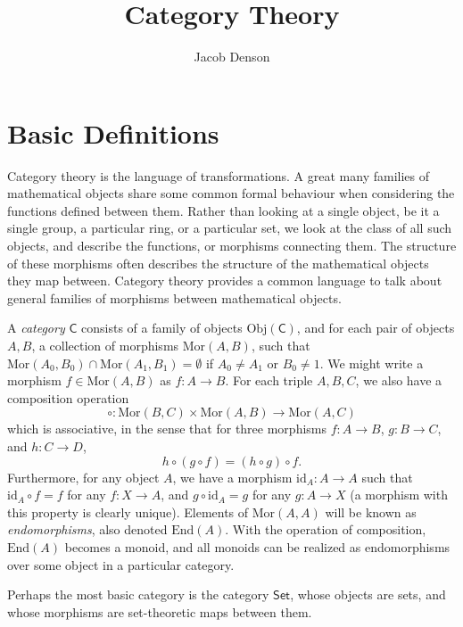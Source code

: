 

\title{Category Theory}
\author{Jacob Denson}



\maketitle
\tableofcontents

\chapter{Basic Definitions}


Category theory is the language of transformations. A great many families of mathematical objects share some common formal behaviour when considering the functions defined between them. Rather than looking at a single object, be it a single group, a particular ring, or a particular set, we look at the class of all such objects, and describe the functions, or morphisms connecting them. The structure of these morphisms often describes the structure of the mathematical objects they map between. Category theory provides a common language to talk about general families of morphisms between mathematical objects.

A \emph{category} $\mathsf{C}$ consists of a family of objects $\text{Obj}(\mathsf{C})$, and for each pair of objects $A,B$, a collection of morphisms $\text{Mor}(A,B)$, such that $\text{Mor}(A_0,B_0) \cap \text{Mor}(A_1,B_1) = \emptyset$ if $A_0 \neq A_1$ or $B_0 \neq 1$. We might write a morphism $f \in \text{Mor}(A,B)$ as $f: A \to B$. For each triple $A,B,C$, we also have a composition operation
%
\[ \circ: \text{Mor}(B,C) \times \text{Mor}(A,B) \to \text{Mor}(A,C) \]
%
which is associative, in the sense that for three morphisms $f: A \to B$, $g: B \to C$, and $h: C \to D$,
%
\[ h \circ (g \circ f) = (h \circ g) \circ f. \]
%
Furthermore, for any object $A$, we have a morphism $\text{id}_A: A \to A$ such that $\text{id}_A \circ f = f$ for any $f: X \to A$, and $g \circ \text{id}_A = g$ for any $g: A \to X$ (a morphism with this property is clearly unique). Elements of $\text{Mor}(A,A)$ will be known as \emph{endomorphisms}, also denoted $\text{End}(A)$. With the operation of composition, $\text{End}(A)$ becomes a monoid, and all monoids can be realized as endomorphisms over some object in a particular category.

\begin{example}
    Perhaps the most basic category is the category $\mathsf{Set}$, whose objects are sets, and whose morphisms are set-theoretic maps between them.
\end{example}

